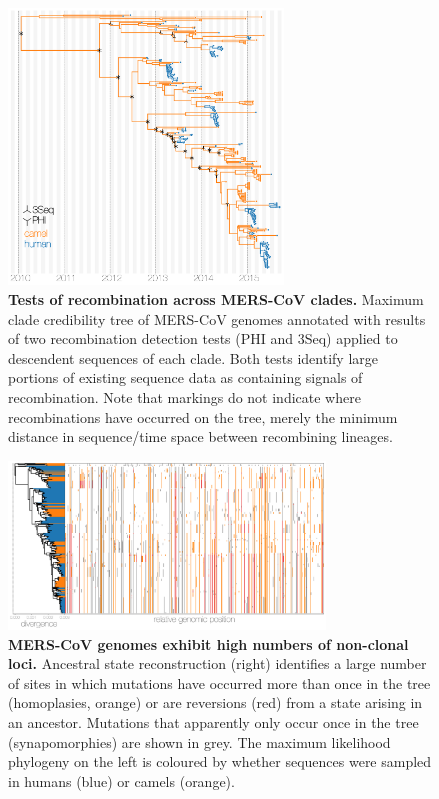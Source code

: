 \documentclass[9pt,lineno]{elife}
\begin{document}
\begin{figure}[h]
\centering
	\includegraphics[width=0.65\textwidth]{figures/mers_recombination_tree.png}
	\caption{\textbf{Tests of recombination across MERS-CoV clades.}
Maximum clade credibility tree of MERS-CoV genomes annotated with results of two recombination detection tests (PHI and 3Seq) applied to descendent sequences of each clade.
Both tests identify large portions of existing sequence data as containing signals of recombination.
Note that markings do not indicate where recombinations have occurred on the tree, merely the minimum distance in sequence/time space between recombining lineages.}
	\label{recombination_tree}
\end{figure}

\begin{figure}[h]
\centering
	\includegraphics[width=0.75\textwidth]{figures/mers_incompatibilities.png}
	\caption{\textbf{MERS-CoV genomes exhibit high numbers of non-clonal loci.}
Ancestral state reconstruction (right) identifies a large number of sites in which mutations have occurred more than once in the tree (homoplasies, orange) or are reversions (red) from a state arising in an ancestor.
Mutations that apparently only occur once in the tree (synapomorphies) are shown in grey.
The maximum likelihood phylogeny on the left is coloured by whether sequences were sampled in humans (blue) or camels (orange).
	}
	\label{incompatibilities}
\end{figure}
\end{document}

